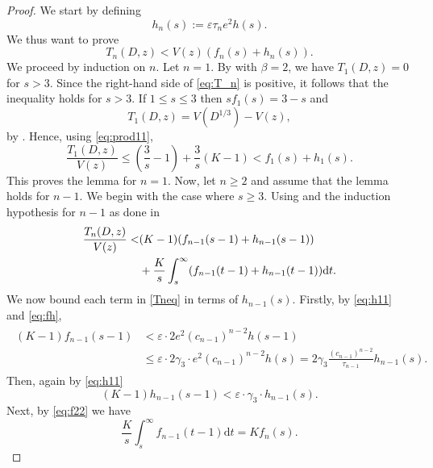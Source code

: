 \documentclass[12pt]{amsart}
\begin{document}
\begin{proof}
We start by defining 
\begin{equation}
    \label{eq:hnf}
    h_n(s):=\varepsilon\tau_n e^2h(s).
\end{equation}
We thus want to prove 
\begin{equation}
\label{eq:T_n}
    T_n(D,z)<V(z)\left( f_n(s)+h_n(s)\right).
\end{equation}
We proceed by induction on $n$. Let $n=1$. By \cite[Lemma 9.3]{Nathanson} with $\beta =2$, we have $T_1(D,z)=0$ for $s>3$. Since the right-hand side of \eqref{eq:T_n} is positive, it follows that the inequality holds for $s>3$. If $1\le s \le 3$ then $sf_1(s)=3-s$ and 
\begin{equation*}
T_1(D,z)=V(D^{1/3})-V(z),
\end{equation*}
by \cite[(9.13)]{Nathanson}. Hence, using \eqref{eq:prod11},
\begin{equation*}
\frac{T_1(D,z)}{V(z)}\le \left(\frac{3}{s}-1\right)+\frac{3}{s}(K-1)<f_1(s)+h_1(s).
\end{equation*}
This proves the lemma for $n=1$. Now, let $n\ge 2$ and assume that the lemma holds for $n-1$. We begin with the case where $s\ge 3$. Using \cite[Lemma 9.8]{Nathanson} and the induction hypothesis for $n-1$ as done in \cite[Theorem 9.5]{Nathanson}
\begin{align}\label{Tneq}
    \frac{T_n(D,z)}{V(z)}< & (K-1)(f_{n-1}(s-1)+h_{n-1}(s-1)) \\&+\frac{K}{s}\int_s^{\infty} (f_{n-1}(t-1)+h_{n-1}(t-1))\mathrm{d}t.\notag
\end{align}
We now bound each term in \eqref{Tneq} in terms of $h_{n-1}(s)$. Firstly, by \eqref{eq:h11} and \eqref{eq:fh},
\begin{align}
\label{eq:Tn3}
\begin{split}
(K-1)f_{n-1}(s-1)&< \varepsilon\cdot 2e^2(c_{n-1})^{n-2}h(s-1)\\&\le \varepsilon\cdot 2\gamma_3\cdot e^2(c_{n-1})^{n-2}h(s)=2\gamma_3\frac{(c_{n-1})^{n-2}}{\tau_{n-1}} h_{n-1}(s).\end{split}
\end{align}
Then, again by \eqref{eq:h11}
\begin{equation}\label{eq:Tn4}
    (K-1)h_{n-1}(s-1)<\varepsilon\cdot\gamma_3\cdot h_{n-1}(s).
\end{equation}
Next, by \eqref{eq:f22} we have
\begin{equation*}
\frac{K}{s}\int_s^{\infty} f_{n-1}(t-1)\mathrm{d}t=Kf_n(s).
\end{equation*}

\end{proof}
\end{document}
